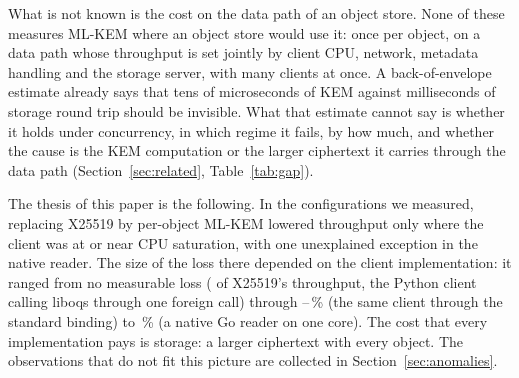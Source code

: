 \documentclass[conference]{IEEEtran}
\begin{document}
What is not known is the cost on the data path of an object store. None of these measures ML-KEM where an object store would use it: once
per object, on a data path whose throughput is set jointly by client CPU, network, metadata
handling and the storage server, with many clients at once. A back-of-envelope estimate already
says that tens of microseconds of KEM against milliseconds of storage round trip should be
invisible. What that estimate cannot say is whether it holds under concurrency, in which regime
it fails, by how much, and whether the cause is the KEM computation or the larger ciphertext it
carries through the data path (Section~\ref{sec:related}, Table~\ref{tab:gap}).

The thesis of this paper is the following. In the configurations we measured, replacing X25519 by per-object ML-KEM lowered
throughput only where the client was at or near CPU saturation, with one unexplained exception
in the native reader. The size of the loss there depended on the client implementation: it
ranged from no measurable
loss (\AudBindReleasedRatio{} of X25519's throughput, the Python client calling liboqs through
one foreign call) through \RevHotDeficit--\ArmHotDeficit\,\% (the same client through the
standard binding) to \AudNOneMlkemDeficit\,\% (a native Go reader on one core). The cost that
every implementation pays is storage: a larger ciphertext with every object. The observations
that do not fit this picture are collected in Section~\ref{sec:anomalies}.
\end{document}
